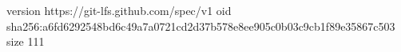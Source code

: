 version https://git-lfs.github.com/spec/v1
oid sha256:a6fd6292548bd6c49a7a0721cd2d37b578e8ee905c0b03c9cb1f89e35867c503
size 111
